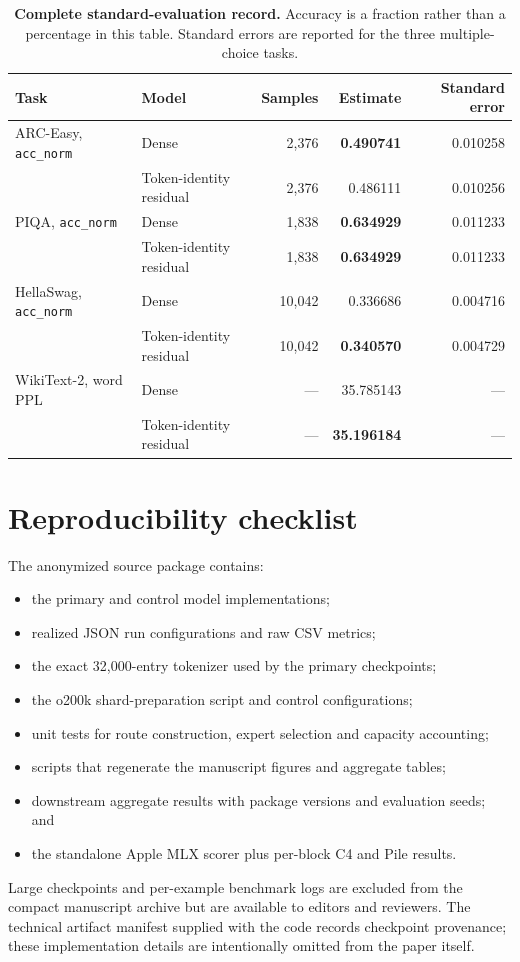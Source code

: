 \documentclass[11pt]{article}
\begin{document}
\begin{table}[H]
\centering
\footnotesize
\setlength{\tabcolsep}{4pt}
\caption{\textbf{Complete standard-evaluation record.} Accuracy is a fraction rather than a percentage in this table. Standard errors are reported for the three multiple-choice tasks.}
\label{tab:s4}
\begin{tabular}{llrrr}
\toprule
Task & Model & Samples & Estimate & Standard error \\
\midrule
ARC-Easy, \texttt{acc\_norm} & Dense & 2,376 & \textbf{0.490741} & 0.010258 \\
& Token-identity residual & 2,376 & 0.486111 & 0.010256 \\
PIQA, \texttt{acc\_norm} & Dense & 1,838 & \textbf{0.634929} & 0.011233 \\
& Token-identity residual & 1,838 & \textbf{0.634929} & 0.011233 \\
HellaSwag, \texttt{acc\_norm} & Dense & 10,042 & 0.336686 & 0.004716 \\
& Token-identity residual & 10,042 & \textbf{0.340570} & 0.004729 \\
WikiText-2, word PPL & Dense & --- & 35.785143 & --- \\
& Token-identity residual & --- & \textbf{35.196184} & --- \\
\bottomrule
\end{tabular}
\end{table}

\section*{Reproducibility checklist}

The anonymized source package contains:
\begin{itemize}
  \item the primary and control model implementations;
  \item realized JSON run configurations and raw CSV metrics;
  \item the exact 32,000-entry tokenizer used by the primary checkpoints;
  \item the o200k shard-preparation script and control configurations;
  \item unit tests for route construction, expert selection and capacity accounting;
  \item scripts that regenerate the manuscript figures and aggregate tables;
  \item downstream aggregate results with package versions and evaluation seeds; and
  \item the standalone Apple MLX scorer plus per-block C4 and Pile results.
\end{itemize}

Large checkpoints and per-example benchmark logs are excluded from the compact manuscript archive but are available to editors and reviewers. The technical artifact manifest supplied with the code records checkpoint provenance; these implementation details are intentionally omitted from the paper itself.
\end{document}
